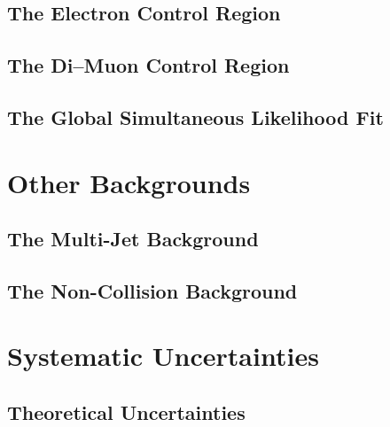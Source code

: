 \documentclass[10pt,twoside,cucitura,classica,english,openany]{toptesi}
\begin{document}
\subsection{The Electron Control Region}
\label{sec:electr-contr-regi}



\subsection{The Di--Muon Control Region}
\label{sec:di-muon-control}



\subsection{The Global Simultaneous Likelihood Fit}
\label{sec:glob-simult-likel}



\section{Other Backgrounds}
\label{sec:other-backgrounds}

\subsection{The Multi-Jet Background}
\label{sec:multi-jet-background}



\subsection{The Non-Collision Background}
\label{sec:non-coll-backgr}



\section{Systematic Uncertainties}
\label{sec:syst-uncert}



\subsection{Theoretical Uncertainties}
\label{sec:theor-uncert}


\end{document}
